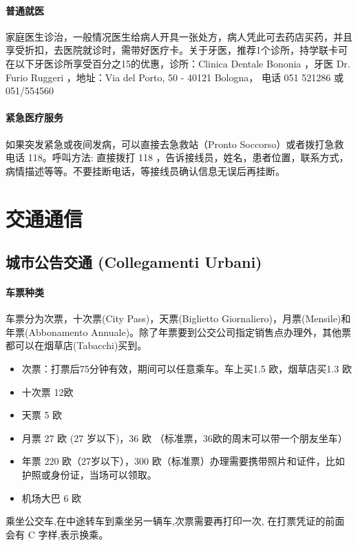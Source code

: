 \documentclass[3pt,a5paper,openright,twoside]{book}
\begin{document}
\subsubsection{普通就医}
家庭医生诊治，一般情况医生给病人开具一张处方，病人凭此可去药店买药，并且享受折扣，去医院就诊时，需带好医疗卡。关于牙医，推荐1个诊所，持学联卡可在以下牙医诊所享受百分之15的优惠，诊所：Clinica Dentale Bononia ，牙医 Dr. Furio Ruggeri ，地址：Via del Porto, 50 - 40121 Bologna， 电话 051 521286 或 051/554560 

\subsubsection{紧急医疗服务}

如果突发紧急或夜间发病，可以直接去急救站（Pronto Soccorso）或者拨打急救电话 118。呼叫方法: 直接拨打 118 ，告诉接线员，姓名，患者位置，联系方式，病情描述等等。不要挂断电话，等接线员确认信息无误后再挂断。



% 
%
%
%

\chapter{交通通信}                 %

\section{城市公告交通 (Collegamenti Urbani)}

\subsubsection*{车票种类}
车票分为次票，十次票(City Pass)，天票(Biglietto Giornaliero)，月票(Mensile)和年票(Abbonamento Annuale)。除了年票要到公交公司指定销售点办理外，其他票都可以在烟草店(Tabacchi)买到。
\begin{itemize}
\item  次票：打票后75分钟有效，期间可以任意乘车。车上买1.5 欧，烟草店买1.3 欧
\item  十次票 12欧
\item  天票 5 欧
\item  月票 27 欧 (27 岁以下)，36 欧 （标准票，36欧的周末可以带一个朋友坐车）
\item  年票 220 欧（27岁以下），300 欧（标准票）办理需要携带照片和证件，比如护照或身份证，当场可以领取。
\item  机场大巴 6 欧
\end{itemize}
乘坐公交车,在中途转车到乘坐另一辆车,次票需要再打印一次, 在打票凭证的前面会有 C 字样,表示换乘。
\end{document}
